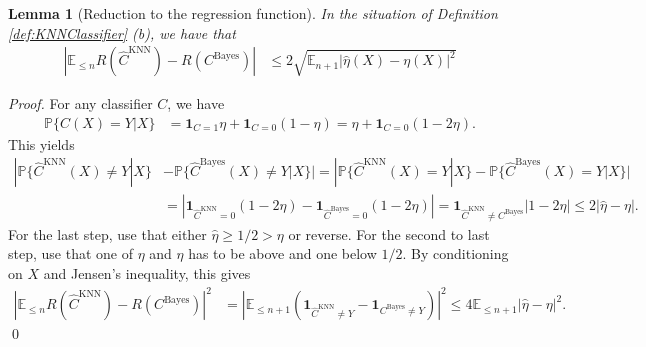 \documentclass[a4paper,11pt]{article} %
\numberwithin{equation}{section}
\renewenvironment{proof}
  {{\noindent \itshape \color{gruvblue} Proof. }}{\color{gruvblue}\qed}
\theoremstyle{ndefinition}
\theoremstyle{nremark}
\theoremstyle{nplain}
\newtheorem{lem}[defi]{Lemma}
\begin{document}
\begin{lem}[Reduction to the regression function]%
  \label{lem:ReductionToTheRegressionFunction}
  In the situation of Definition \ref{def:KNNClassifier} (b), we have that 
  \begin{align*}
    | \mathbb{E}_{\le n} R(\hat C^{\text{KNN}}) - R(C^{\text{Bayes}}) | 
    & \le 2 \sqrt{\mathbb{E}_{n + 1} | \hat \eta(X) - \eta(X) |^{2}} 
  \end{align*}
\end{lem}%
\begin{proof}%
  For any classifier \( C \), we have 
  \begin{align*}
    \mathbb{P} \{ C(X) = Y | X \} 
    & = \mathbf{1}_{C = 1} \eta + \mathbf{1}_{C = 0} ( 1 - \eta ) 
      = \eta + \mathbf{1}_{C = 0} ( 1 - 2 \eta ). 
  \end{align*}
  This yields 
  \begin{align*}
    | 
        \mathbb{P} \{ \hat C^{\text{KNN}}(X) \ne Y | X \} 
      & 
      - \mathbb{P} \{ \hat C^{\text{Bayes}}(X) \ne Y | X \} 
    | 
      = | 
            \mathbb{P} \{ \hat C^{\text{KNN}}(X) = Y | X \} 
          - \mathbb{P} \{ \hat C^{\text{Bayes}}(X) = Y | X \} 
        | 
    \\ 
    & = | 
          \mathbf{1}_{\hat C^{\text{KNN}} = 0} ( 1 - 2 \eta ) 
          - 
          \mathbf{1}_{\hat C^{\text{Bayes}} = 0} ( 1 - 2 \eta ) 
        | 
      = \mathbf{1}_{\hat C^{\text{KNN}} \ne C^{\text{Bayes}}} 
        | 1 - 2 \eta | 
      \le 2 | \hat \eta - \eta |.
  \end{align*}
  For the last step, use that either \( \hat \eta \ge 1 / 2 > \eta \) or
  reverse.
  For the second to last step, use that one of \( \eta \) and \( \hat \eta \)
  has to be above and one below \( 1 / 2 \). 
  By conditioning on \( X \) and Jensen's inequality, this gives
  \begin{align*}
    | \mathbb{E}_{\le n} R(\hat C^{\text{KNN}}) - R(C^{\text{Bayes}}) |^{2} 
    & = | 
          \mathbb{E}_{\le n + 1} ( 
              \mathbf{1}_{\hat C^{\text{KNN}} \ne Y} 
            - \mathbf{1}_{C^{\text{Bayes}} \ne Y}
          )
        |^{2} 
      \le 4 \mathbb{E}_{\le n + 1} | \hat \eta - \eta |^{2}.
  \end{align*}
\end{proof}%
\end{document}
